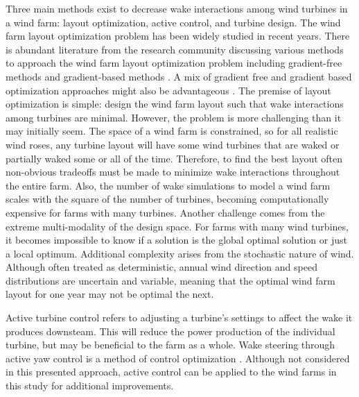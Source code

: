 \documentclass[WESD, manuscript]{copernicus}
\begin{document}
Three main methods exist to decrease wake interactions among wind turbines in a wind farm: layout optimization, active control, and turbine design. The wind farm layout optimization problem has been widely studied in recent years. There is abundant literature from the research community discussing various methods to approach the wind farm layout optimization problem including gradient-free methods \citep{marmidis2008optimal,emami2010new,kusiak2010design,ituarte2011optimization,feng2015solving,gao2015wind} and gradient-based methods \citep{perez2013offshore,park2015layout,Fleming2016,guirguis2016toward,gebraad2017maximization}. 
%
A mix of gradient free and gradient based optimization approaches might also be advantageous \citep{rethore2014topfarm}.
%
The premise of layout optimization is simple: design the wind farm layout such that wake interactions among turbines are minimal.
However, the problem is more challenging than it may initially seem. 
The space of a wind farm is constrained, so for all realistic wind roses, any turbine layout will have some wind turbines that are waked or partially waked some or all of the time. Therefore, to find the best layout often non-obvious tradeoffs must be made to minimize wake interactions throughout the entire farm.
Also, the number of wake simulations to model a wind farm scales with the square of the number of turbines, becoming computationally expensive for farms with many turbines. Another challenge comes from the extreme multi-modality of the design space. For farms with many wind turbines, it becomes impossible to know if a solution is the global optimal solution or just a local optimum.  Additional complexity arises from the stochastic nature of wind. Although often treated as deterministic, annual wind direction and speed distributions are uncertain and variable, meaning that the optimal wind farm layout for one year may not be optimal the next.



Active turbine control refers to adjusting a turbine's settings to affect the wake it produces downsteam. This will reduce the power production of the individual turbine, but may be beneficial to the farm as a whole. Wake steering through active yaw control is a method of control optimization \citep{Fleming2016,gebraad2017maximization}. Although not considered in this presented approach, active control can be applied to the wind farms in this study for additional improvements.
\end{document}
